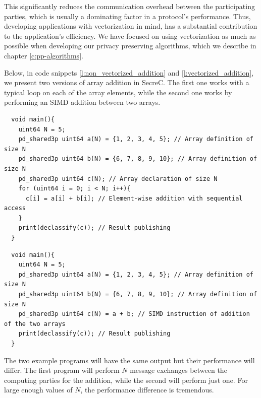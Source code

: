 This significantly reduces the communication overhead between the participating parties, which is usually a dominating factor in a protocol's performance.
Thus, developing applications with vectorization in mind, has a substantial contribution to the application's efficiency.
We have focused on using vectorization as much as possible when developing our privacy preserving algorithms, which we describe in chapter \ref{c:pp-algorithms}.

Below, in code snippets \ref{l:non_vectorized_addition} and \ref{l:vectorized_addition}, we present two versions of array addition in SecreC.
The first one works with a typical loop on each of the array elements, while the second one works by performing an SIMD addition between two arrays.

{
\begin{verbatim}
  void main(){
    uint64 N = 5;
    pd_shared3p uint64 a(N) = {1, 2, 3, 4, 5}; // Array definition of size N
    pd_shared3p uint64 b(N) = {6, 7, 8, 9, 10}; // Array definition of size N
    pd_shared3p uint64 c(N); // Array declaration of size N
    for (uint64 i = 0; i < N; i++){
      c[i] = a[i] + b[i]; // Element-wise addition with sequential access
    }
    print(declassify(c)); // Result publishing
  }
\end{verbatim}
\label{l:non_vectorized_addition}
}

{
\begin{verbatim}
  void main(){
    uint64 N = 5;
    pd_shared3p uint64 a(N) = {1, 2, 3, 4, 5}; // Array definition of size N
    pd_shared3p uint64 b(N) = {6, 7, 8, 9, 10}; // Array definition of size N
    pd_shared3p uint64 c(N) = a + b; // SIMD instruction of addition of the two arrays
    print(declassify(c)); // Result publishing
  }
\end{verbatim}
\label{l:vectorized_addition}
}

The two example programs will have the same output but their performance will differ.
The first program will perform $N$ message exchanges between the computing parties for the addition, while the second will perform just one.
For large enough values of $N$, the performance difference is tremendous.



